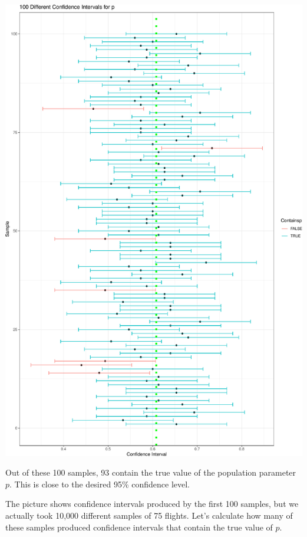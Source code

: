 \documentclass[
  letterpaper,
  DIV=11,
  numbers=noendperiod]{scrreprt}
\newenvironment{Shaded}{\begin{snugshade}}{\end{snugshade}}
\newcommand{\ConstantTok}[1]{\textcolor[rgb]{0.56,0.35,0.01}{#1}}
\newcommand{\FunctionTok}[1]{\textcolor[rgb]{0.28,0.35,0.67}{#1}}
\newcommand{\NormalTok}[1]{\textcolor[rgb]{0.00,0.23,0.31}{#1}}
\newcommand{\SpecialCharTok}[1]{\textcolor[rgb]{0.37,0.37,0.37}{#1}}
\begin{document}
\includegraphics{Ch3_files/figure-pdf/unnamed-chunk-37-1.pdf}

Out of these 100 samples, 93 contain the true value of the population
parameter \(p\). This is close to the desired 95\% confidence level.

The picture shows confidence intervals produced by the first 100
samples, but we actually took 10,000 different samples of 75 flights.
Let's calculate how many of these samples produced confidence intervals
that contain the true value of \(p\).

\begin{Shaded}
\end{Shaded}
\end{document}
